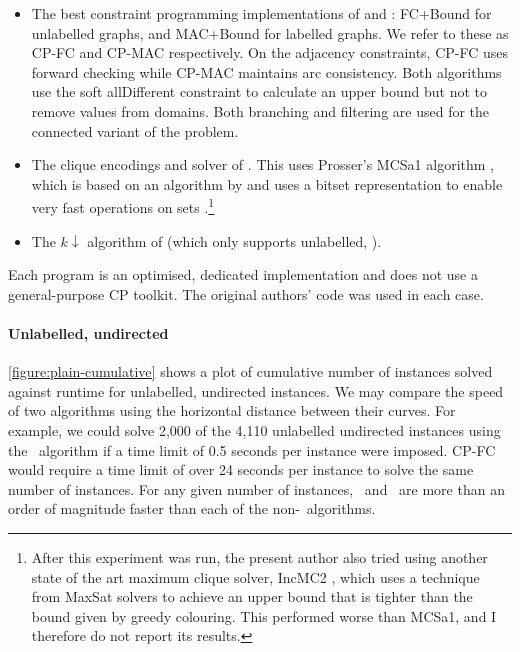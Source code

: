 \begin{itemize}
\item The best constraint
programming implementations of \citet{DBLP:conf/cp/NdiayeS11} and
\citet{DBLP:conf/cp/McCreeshNPS16}:
FC+Bound for unlabelled graphs,
and MAC+Bound for labelled graphs.  We refer to these as CP-FC and
CP-MAC respectively.  On the adjacency constraints, CP-FC uses forward checking
while CP-MAC maintains arc consistency.
Both algorithms use the soft allDifferent constraint to calculate
an upper bound but not to remove values from domains.
Both branching and filtering are used for the connected variant of
the problem.
\item The clique encodings and solver of \citet{DBLP:conf/cp/McCreeshNPS16}.
This uses Prosser's MCSa1 algorithm \citep{DBLP:journals/algorithms/Prosser12}, which is
based on an algorithm by \citet{DBLP:journals/ieicet/TomitaSHW13} and uses a
bitset representation to enable very fast operations on sets
\citep{DBLP:journals/cor/SegundoRJ11}.\footnote{
After this experiment was run,
the present author also tried using another state of the
art maximum clique solver, IncMC2 \citep{DBLP:journals/informs/LiFJX18}, which
uses a technique from MaxSat solvers to achieve an upper bound that is tighter
than the bound given by greedy colouring.
This performed worse than MCSa1, and I therefore do not report its
results.}
\item The
$k{\downarrow}$ algorithm of \citet{UpcomingAAAIPaper} (which only supports
unlabelled,  ).
\end{itemize}

Each
program is an optimised, dedicated implementation and does not use a
general-purpose CP toolkit.  The original authors'
code was used in each case.







\paragraph{Unlabelled, undirected}
\cref{figure:plain-cumulative} shows a plot of cumulative 
number of instances solved against runtime for unlabelled, undirected
instances.  We may compare
the speed of two algorithms using the horizontal distance between their curves.
For example, we could solve 2,000 of the 4,110 unlabelled undirected instances
using the \McSplit\ algorithm if a time limit of 0.5 seconds per instance were
imposed.  CP-FC would require a time limit of over 24
seconds per instance to solve the same number of instances.  For any given
number of instances, \McSplit\ and \McSplitDown\ are more than an order of magnitude
faster than each of the non-\McSplit\ algorithms.

